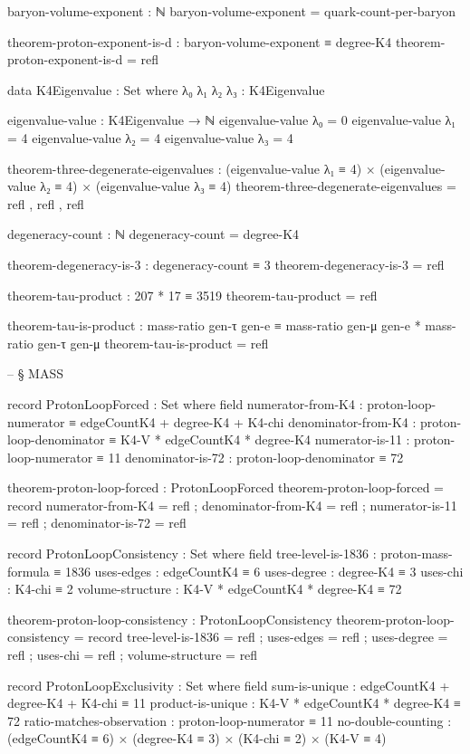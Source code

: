 \documentclass[11pt,a4paper]{book}
\begin{document}
\begin{code}
baryon-volume-exponent : ℕ
baryon-volume-exponent = quark-count-per-baryon

theorem-proton-exponent-is-d : baryon-volume-exponent ≡ degree-K4
theorem-proton-exponent-is-d = refl

data K4Eigenvalue : Set where
  λ₀ λ₁ λ₂ λ₃ : K4Eigenvalue

eigenvalue-value : K4Eigenvalue → ℕ
eigenvalue-value λ₀ = 0
eigenvalue-value λ₁ = 4
eigenvalue-value λ₂ = 4
eigenvalue-value λ₃ = 4

theorem-three-degenerate-eigenvalues :
  (eigenvalue-value λ₁ ≡ 4) ×
  (eigenvalue-value λ₂ ≡ 4) ×
  (eigenvalue-value λ₃ ≡ 4)
theorem-three-degenerate-eigenvalues = refl , refl , refl

degeneracy-count : ℕ
degeneracy-count = degree-K4

theorem-degeneracy-is-3 : degeneracy-count ≡ 3
theorem-degeneracy-is-3 = refl

theorem-tau-product : 207 * 17 ≡ 3519
theorem-tau-product = refl

theorem-tau-is-product : mass-ratio gen-τ gen-e ≡ 
                         mass-ratio gen-μ gen-e * mass-ratio gen-τ gen-μ
theorem-tau-is-product = refl


-- § MASS

record ProtonLoopForced : Set where
  field
    numerator-from-K4 : proton-loop-numerator ≡ edgeCountK4 + degree-K4 + K4-chi
    denominator-from-K4 : proton-loop-denominator ≡ K4-V * edgeCountK4 * degree-K4
    numerator-is-11 : proton-loop-numerator ≡ 11
    denominator-is-72 : proton-loop-denominator ≡ 72

theorem-proton-loop-forced : ProtonLoopForced
theorem-proton-loop-forced = record
  { numerator-from-K4 = refl
  ; denominator-from-K4 = refl
  ; numerator-is-11 = refl
  ; denominator-is-72 = refl
  }

record ProtonLoopConsistency : Set where
  field
    tree-level-is-1836 : proton-mass-formula ≡ 1836
    uses-edges : edgeCountK4 ≡ 6
    uses-degree : degree-K4 ≡ 3
    uses-chi : K4-chi ≡ 2
    volume-structure : K4-V * edgeCountK4 * degree-K4 ≡ 72

theorem-proton-loop-consistency : ProtonLoopConsistency
theorem-proton-loop-consistency = record
  { tree-level-is-1836 = refl
  ; uses-edges = refl
  ; uses-degree = refl
  ; uses-chi = refl
  ; volume-structure = refl
  }

record ProtonLoopExclusivity : Set where
  field
    sum-is-unique : edgeCountK4 + degree-K4 + K4-chi ≡ 11
    product-is-unique : K4-V * edgeCountK4 * degree-K4 ≡ 72
    ratio-matches-observation : proton-loop-numerator ≡ 11
    no-double-counting : (edgeCountK4 ≡ 6) × (degree-K4 ≡ 3) × (K4-chi ≡ 2) × (K4-V ≡ 4)


\end{code}
\end{document}

